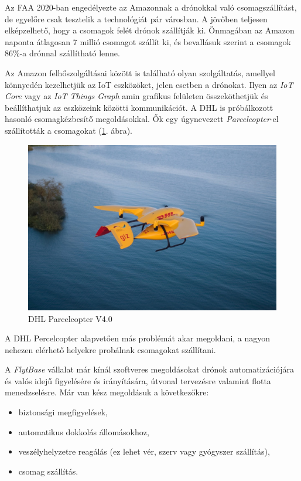Az FAA 2020-ban engedélyezte az Amazonnak a drónokkal való csomagszállítást, de egyelőre csak tesztelik a technológiát pár városban.
A jövőben teljesen elképzelhető, hogy a csomagok felét drónok szállítják ki.
Önmagában az Amazon naponta átlagosan 7 millió csomagot szállít ki, és bevallásuk szerint a csomagok 86\%-a drónnal szállítható lenne.

Az Amazon felhőszolgáltásai között is található olyan szolgáltatás, amellyel könnyedén kezelhetjük az IoT eszközöket, jelen esetben a drónokat.
Ilyen az \textit{IoT Core} vagy az \textit{IoT Things Graph} amin grafikus felületen összeköthetjük és beállíthatjuk az eszközeink közötti kommunikációt.
A DHL is próbálkozott hasonló csomagkézbesítő megoldásokkal.
Ők egy úgynevezett  \textit{Parcelcopter}-el szállították a csomagokat (\ref{fig:parcelcopter}. ábra).

\begin{figure}[h]
    \centering
    \includegraphics[scale=1.0]{images/parcelcopter.jpeg}
    \caption{DHL Parcelcopter V4.0 \cite{dhl_2018}}
    \label{fig:parcelcopter}
\end{figure}

A DHL Percelcopter alapvetően más problémát akar megoldani, a nagyon nehezen elérhető helyekre probálnak csomagokat szállítani.

A \textit{FlytBase} \cite{flyt} vállalat már kínál szoftveres megoldásokat drónok automatizációjára és valós idejű figyelésére és irányítására, útvonal tervezésre valamint flotta menedzselésre.
Már van kész megoldásuk a következőkre:
\begin{itemize}
    \item biztonsági megfigyelések,
    \item automatikus dokkolás állomásokhoz,
    \item veszélyhelyzetre reagálás (ez lehet vér, szerv vagy gyógyszer szállítás),
    \item csomag szállítás.
\end{itemize}

